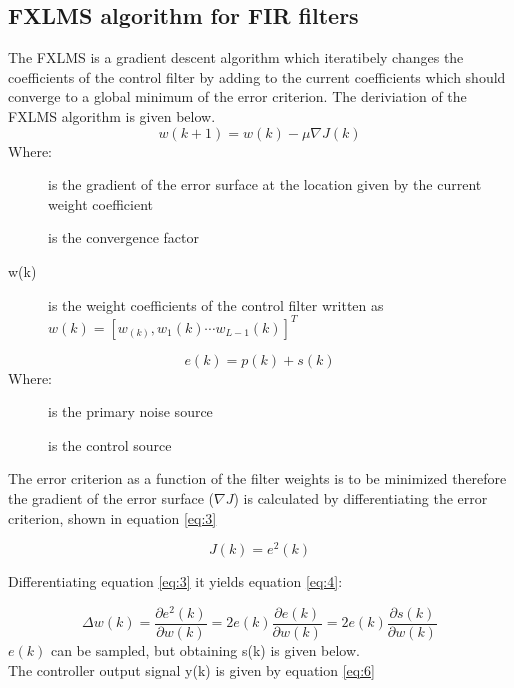 \subsection*{FXLMS algorithm for FIR filters}\label{subsec:fxlms}
The FXLMS is a gradient descent algorithm which iteratibely changes the coefficients of the control filter by adding to the current coefficients which should converge to a global minimum of the error criterion. The deriviation of the FXLMS algorithm is given below. 
\begin{equation}\label{eq:1}
w(k+1) = w(k) - \mu\nabla J(k)
\end{equation}
Where:
\begin{description}
	\item[] is the gradient of the error surface at the location given by the current weight coefficient
	\item[\text{$\mu$}] is the convergence factor
	\item[w(k)] is the weight coefficients of the control filter written as  $w(k)=[w_(k),w_1(k) \cdots w_{L-1}(k)]^T$
\end{description}

\begin{equation}\label{eq:2}
e(k) = p(k) + s(k)
\end{equation}
Where:
\begin{description}
	\item[] is the primary noise source
	\item[] is the control source
\end{description}

The error criterion as a function of the filter weights is to be minimized therefore the gradient of the error surface ($\nabla J$) is calculated by differentiating the error criterion, shown in equation \ref{eq:3} 

\begin{equation}\label{eq:3}
J(k) = e^2(k)
\end{equation}

Differentiating equation \ref{eq:3} it yields equation \ref{eq:4}:

\begin{equation}\label{eq:4}
\Delta w(k) = \frac{\partial e^2(k)}{\partial w(k)} = 2e(k)\frac{\partial e(k)}{\partial w(k)} = 2e(k)\frac{\partial s(k)}{\partial w(k)}
\end{equation}
$e(k)$ can be sampled, but obtaining s(k) is given below. \\
The controller output signal y(k) is given by equation \ref{eq:6} 

